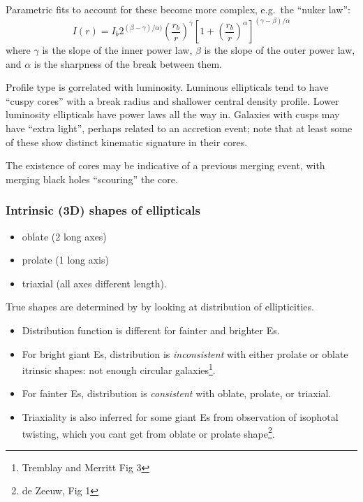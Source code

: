\documentclass{article}
\begin{document}
Parametric fits to account for these become more complex,
e.g.\ the ``nuker law'':
\[
    I(r) = I_{b}2^{ (\beta-\gamma) / \alpha) }
    \left( \frac{r_{b}}{r} \right) ^{\gamma}
    \left[ 1 + \left( \frac{r_{b}}{r} \right) ^{\alpha} \right]
    ^{ \left( \gamma - \beta \right) / \alpha }
    \]
where $\gamma$ is the slope of the inner power law, $\beta$ is the slope of
the outer power law, and $\alpha$ is the sharpness of the break between
them.

Profile type is \href{http://astronomy.nmsu.edu/holtz/a555/images/lauerfig5.htm}
correlated with luminosity. Luminous ellipticals tend to
have ``cuspy cores'' with a break radius and shallower central density
profile. Lower luminosity ellipticals have power laws all the way in.
Galaxies with cusps may have ``extra light'', perhaps related to an
accretion event; note that at least some of these show distinct kinematic
signature in their cores.

The existence of cores may be indicative of a previous merging event, with
merging black holes ``scouring'' the core.

\subsubsection{Intrinsic (3D) shapes of ellipticals}
\begin{itemize}
    \item oblate (2 long axes)
    \item prolate (1 long axis)
    \item triaxial (all axes different length).
\end{itemize}
True shapes are determined by by looking at distribution of ellipticities.
\begin{itemize}
    \item Distribution function is different for fainter and
        brighter Es.
    \item For bright giant Es, distribution is \emph{inconsistent} with
        either prolate or oblate itrinsic shapes: not enough circular
        galaxies\footnote{Tremblay and Merritt Fig 3}.
    \item For fainter Es, distribution is \emph{consistent} with
        oblate, prolate, or triaxial.
    \item Triaxiality is also inferred for some giant Es from
        observation of isophotal twisting, which you cant get from
        oblate or prolate shape\footnote{de Zeeuw, Fig 1}.
\end{itemize}
\end{document}
